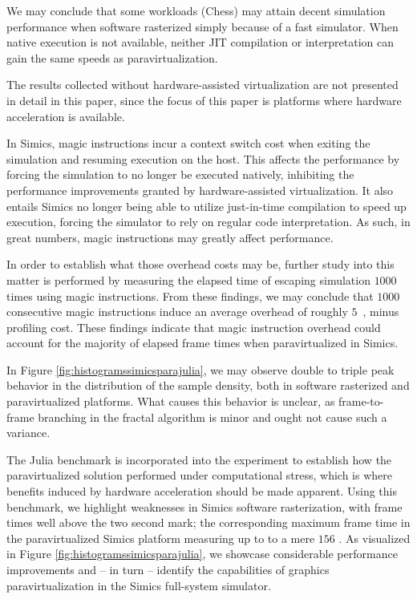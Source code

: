 We may conclude that some workloads (Chess) may attain decent simulation performance when software rasterized simply because of a fast simulator.
When native execution is not available, neither JIT compilation or interpretation can gain the same speeds as paravirtualization.

The results collected without hardware-assisted virtualization are not presented in detail in this paper, since the focus of this paper is platforms where hardware acceleration is available.

In Simics, magic instructions incur a context switch cost when exiting the simulation and resuming execution on the host.
This affects the performance by forcing the simulation to no longer be executed natively, inhibiting the performance improvements granted by hardware-assisted virtualization.
It also entails Simics no longer being able to utilize just-in-time compilation to speed up execution, forcing the simulator to rely on regular code interpretation.
As such, in great numbers, magic instructions may greatly affect performance.

In order to establish what those overhead costs may be, further study into this matter is performed by measuring the elapsed time of escaping simulation $1000$ times using magic instructions.
From these findings, we may conclude that $1000$ consecutive magic instructions induce an average overhead of roughly $5$~\milli\second , minus profiling cost.
These findings indicate that magic instruction overhead could account for the majority of elapsed frame times when paravirtualized in Simics.

In Figure \ref{fig:histogramssimicsparajulia}, we may observe double to triple peak behavior in the distribution of the sample density, both in software rasterized and paravirtualized platforms.
What causes this behavior is unclear, as frame-to-frame branching in the fractal algorithm is minor and ought not cause such a variance.

The Julia benchmark is incorporated into the experiment to establish how the paravirtualized solution performed under computational stress, which is where benefits induced by hardware acceleration should be made apparent.
Using this benchmark, we highlight weaknesses in Simics software rasterization, with frame times well above the two second mark; the corresponding maximum frame time in the paravirtualized Simics platform measuring up to to a mere $156$ \milli\second .
As visualized in Figure \ref{fig:histogramssimicsparajulia}, we showcase considerable performance improvements and -- in turn -- identify the capabilities of graphics paravirtualization in the Simics full-system simulator.

